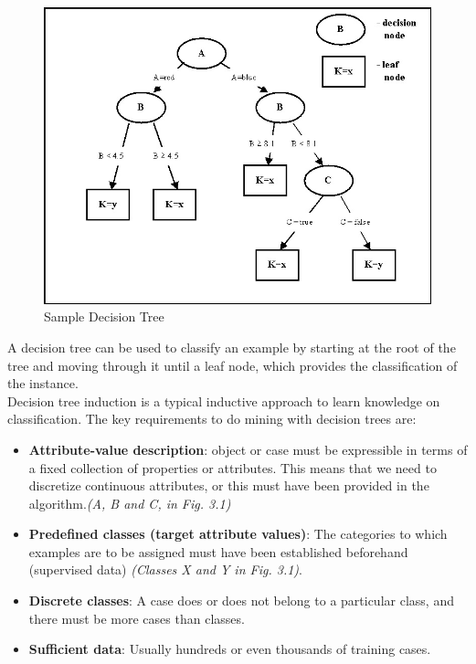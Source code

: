 \documentclass[12pt]{report}
\begin{document}
\begin{figure}[h!]
	\centering
		\includegraphics[scale=1.0]{dtreeexample.jpg}
	\caption{Sample Decision Tree}
	\label{fig:logo2}
\end{figure}

A decision tree can be used to classify an example by starting at the root of the tree and moving through it until a leaf node, which provides the classification of the instance.\\

Decision tree induction is a typical inductive approach to learn knowledge on classification. The key requirements to do mining with decision trees are:
\begin{itemize}
\item{\textbf{Attribute-value description}: object or case must be expressible in terms of a fixed collection of properties or attributes. This means that we need to discretize continuous attributes, or this must have been provided in the algorithm.\textit{(A, B and C, in Fig. 3.1)}}
\item{\textbf{Predefined classes (target attribute values)}: The categories to which examples are to be assigned must have been established beforehand (supervised data) \textit{(Classes X and Y in Fig. 3.1)}.}
\item{\textbf{Discrete classes}: A case does or does not belong to a particular class, and there must be more cases than classes.}
\item{\textbf{Sufficient data}: Usually hundreds or even thousands of training cases.}

\end{itemize}
\end{document}
